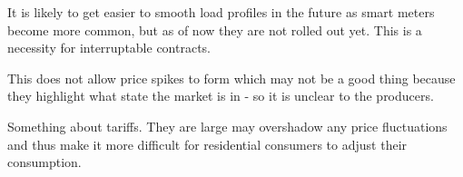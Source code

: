 It is likely to get easier to smooth load profiles in the future as smart meters become more common, but as of now they are not rolled out yet. This is a necessity for interruptable contracts. 

This does not allow price spikes to form which may not be a good thing because they highlight what state the market is in - so it is unclear to the producers. 

Something about tariffs. They are large may overshadow any price fluctuations and thus make it more difficult for residential consumers to adjust their consumption. 

\citep{kirschen2003demand}




